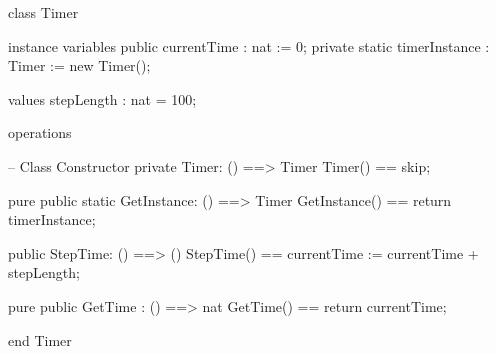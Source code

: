 \documentclass[a4paper]{article}
\begin{document}
\title{}
\author{}
\begin{vdm_al}
class Timer 

instance variables
    public currentTime : nat := 0;
    private static timerInstance : Timer := new Timer();

values 
    stepLength : nat = 100;

operations

    -- Class Constructor
    private Timer: () ==> Timer
    Timer() ==
        skip;

    pure public static GetInstance: () ==> Timer
    GetInstance() ==
        return timerInstance;

    public StepTime: () ==> ()
    StepTime() == 
     currentTime := currentTime + stepLength;
    
    pure public GetTime : () ==> nat
    GetTime() ==
        return currentTime;

end Timer
\end{vdm_al}
\end{document}
